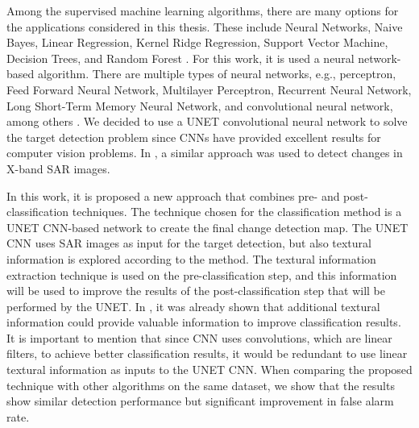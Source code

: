 Among the supervised machine learning algorithms, there are many options for the applications considered in this thesis. These include Neural Networks, Naive Bayes, Linear Regression, Kernel Ridge Regression, Support Vector Machine, Decision Trees, and Random Forest \cite{PefMe}. For this work, it is used a neural network-based algorithm. There are multiple types of neural networks, e.g., perceptron, Feed Forward Neural Network, Multilayer Perceptron, Recurrent Neural Network, Long Short-Term Memory Neural Network, and convolutional neural network, among others \cite{PefMe}. We decided to use a UNET convolutional neural network \cite{Unet} to solve the target detection problem since CNNs have provided excellent results for computer vision problems. In \cite{Kevin}, a similar approach was used to detect changes in X-band SAR images. 

In this work, it is proposed a new approach that combines pre- and post-classification techniques. The technique chosen for the classification method is a UNET CNN-based network to create the final change detection map. The UNET CNN uses SAR images as input for the target detection, but also textural information is explored according to the method. The textural information extraction technique is used on the pre-classification step, and this information will be used to improve the results of the post-classification step that will be performed by the UNET. In \cite{Rodrigo}, it was already shown that additional textural information could provide valuable information to improve classification results. It is important to mention that since CNN uses convolutions, which are linear filters, to achieve better classification results, it would be redundant to use linear textural information as inputs to the UNET CNN. When comparing the proposed technique with other algorithms on the same dataset, we show that the results show similar detection performance but significant improvement in false alarm rate.

